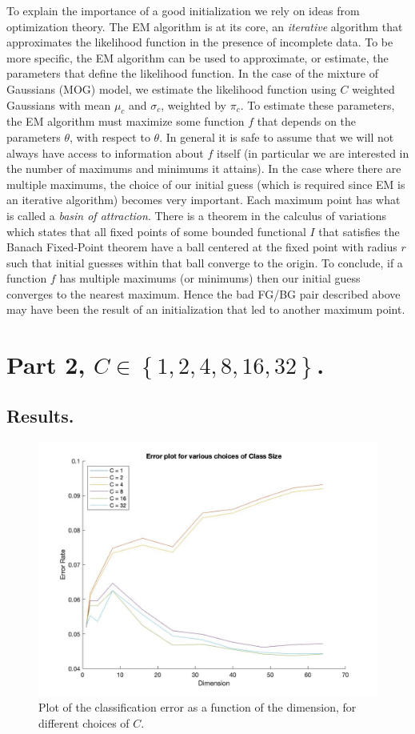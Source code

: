 \documentclass[10pt]{article}
\begin{document}
To explain the importance of a good initialization we rely on ideas from optimization theory. The EM algorithm is at its core, an \textit{iterative} algorithm that approximates the likelihood function in the presence of incomplete data. To be more specific, the EM algorithm can be used to approximate, or estimate, the parameters that define the likelihood function. In the case of the mixture of Gaussians (MOG) model, we estimate the likelihood function using $C$ weighted Gaussians with mean $\mu_c$ and $\sigma_c$, weighted by $\pi_c$. To estimate these parameters, the EM algorithm must maximize some function $f$ that depends on the parameters $\theta$, with respect to $\theta$. In general it is safe to assume that we will not always have access to information about $f$ itself (in particular we are interested in the number of maximums and minimums it attains). In the case where there are multiple maximums, the choice of our initial guess (which is required since EM is an iterative algorithm) becomes very important. Each maximum point has what is called a \textit{basin of attraction}. There is a theorem in the calculus of variations which states that all fixed points of some bounded functional $I$ that satisfies the Banach Fixed-Point theorem have a ball centered at the fixed point with radius $r$ such that initial guesses within that ball converge to the origin. To conclude, if a function $f$ has multiple maximums (or minimums) then our initial guess converges to the nearest maximum. Hence the bad FG/BG pair described above may have been the result of an initialization that led to another maximum point. 
\section{Part 2, $C \in \left\{ 1,2,4,8,16,32 \right\}$.}
\subsection{Results.}
\begin{figure}[H]
	\centering 
	\includegraphics[scale=0.3]{part2_errorplot.jpg}
	\caption{Plot of the classification error as a function of the dimension, for different choices of $C$.}
\end{figure}
\end{document}
